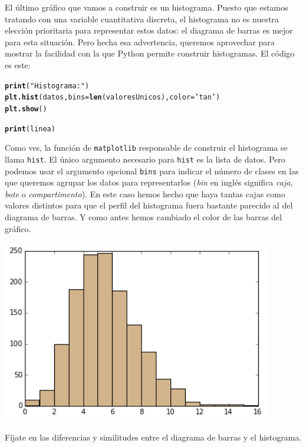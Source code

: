 \documentclass[10pt,a4paper]{article}\usepackage[]{graphicx}\usepackage[]{color}
\makeatletter
\newcommand{\hlstr}[1]{\textcolor[rgb]{0.192,0.494,0.8}{#1}}%
\newcommand{\hlstd}[1]{\textcolor[rgb]{0.345,0.345,0.345}{#1}}%
\newcommand{\hlkwc}[1]{\textcolor[rgb]{0.333,0.667,0.333}{#1}}%
\newcommand{\hlkwd}[1]{\textcolor[rgb]{0.737,0.353,0.396}{\textbf{#1}}}%
\newenvironment{kframe}{%
 \def\at@end@of@kframe{}%
 \ifinner\ifhmode%
  \def\at@end@of@kframe{\end{minipage}}%
  \begin{minipage}{\columnwidth}%
 \fi\fi%
 \def\FrameCommand##1{\hskip\@totalleftmargin \hskip-\fboxsep
 \colorbox{shadecolor}{##1}\hskip-\fboxsep
     \hskip-\linewidth \hskip-\@totalleftmargin \hskip\columnwidth}%
 \MakeFramed {\advance\hsize-\width
   \@totalleftmargin\z@ \linewidth\hsize
   \@setminipage}}%
 {\par\unskip\endMakeFramed%
 \at@end@of@kframe}
\newenvironment{knitrout}{}{} %
\makeatother
\begin{document}
El último gráfico que vamos a construir es un histograma. Puesto que estamos tratando con una variable cuantitativa discreta, el histograma no es nuestra elección prioritaria para representar estos datos: el diagrama de barras es mejor para esta situación. Pero hecha esa advertencia, queremos aprovechar para mostrar la facilidad con la que Python permite construir histogramas. El código es este:
\begin{knitrout}
\color{fgcolor}\begin{kframe}
\begin{alltt}
\hlkwd{print}\hlstd{(}\hlstr{"Histograma:"}\hlstd{)}
\hlkwd{plt.hist}\hlstd{(datos,} \hlkwc{bins}\hlstd{=}\hlkwd{len}\hlstd{(valoresUnicos),} \hlkwc{color}\hlstd{=}\hlstr{'tan'}\hlstd{)}
\hlkwd{plt.show}\hlstd{()}

\hlkwd{print}\hlstd{(linea)}
\end{alltt}
\end{kframe}
\end{knitrout}
Como ves, la función de {\tt matplotlib} responsable de construir el histograma se llama {\tt hist}. El único argumento necesario para {\tt hist} es la lista de datos. Pero podemos usar el argumento opcional {\tt bins} para indicar el número de clases en las que queremos agrupar los datos para representarlos ({\em bin} en inglés significa {\em caja, bote} o {\em compartimento}). En este caso hemos hecho que haya tantas cajas como valores distintos para que el perfil del histograma fuera bastante parecido al del diagrama de barras. Y como antes hemos cambiado el color de las barras del gráfico.
\begin{center}
\includegraphics[height=8cm]{../fig/Tut-02-py-05-histograma.png}
\end{center}
Fíjate en las diferencias y similitudes entre el diagrama de barras y el histograma.
\end{document}
